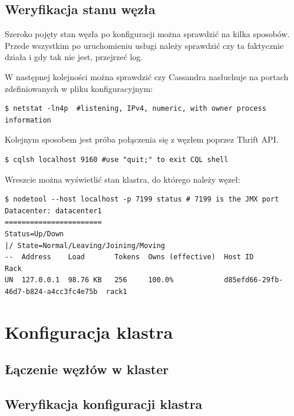 \documentclass{article}
\begin{document}
\subsection{Weryfikacja stanu węzła}

Szeroko pojęty stan węzła po konfiguracji można sprawdzić na kilka sposobów. Przede wszystkim po uruchomieniu usługi należy sprawdzić czy ta faktycznie działa i gdy tak nie jest, przejrzeć log.

W następnej kolejności można sprawdzić czy Cassandra nasłuchuje na portach zdefiniowanych w pliku konfiguracyjnym:

\begin{lstlisting}[style=bash, caption={sprawdzanie na których portach nasłuchuje Cassandra}]
$ netstat -ln4p  #listening, IPv4, numeric, with owner process information
\end{lstlisting}

Kolejnym sposobem jest próba połączenia się z węzłem poprzez Thrift API.
\begin{lstlisting}[style=bash, caption={dostęp do Cassandry przez Thrift API.}]
$ cqlsh localhost 9160 #use "quit;" to exit CQL shell
\end{lstlisting}

Wreszcie można wyświetlić stan klastra, do którego należy węzeł:
\begin{lstlisting}[style=bash, caption={sprawdzanie stanu klastra}]
$ nodetool --host localhost -p 7199 status # 7199 is the JMX port
Datacenter: datacenter1
=======================
Status=Up/Down
|/ State=Normal/Leaving/Joining/Moving
--  Address    Load       Tokens  Owns (effective)  Host ID                               Rack
UN  127.0.0.1  98.76 KB   256     100.0%            d85efd66-29fb-46d7-b824-a4cc3fc4e75b  rack1
\end{lstlisting}

\section{Konfiguracja klastra}

\subsection{Łączenie węzłów w klaster}

\subsection{Weryfikacja konfiguracji klastra}
\end{document}
